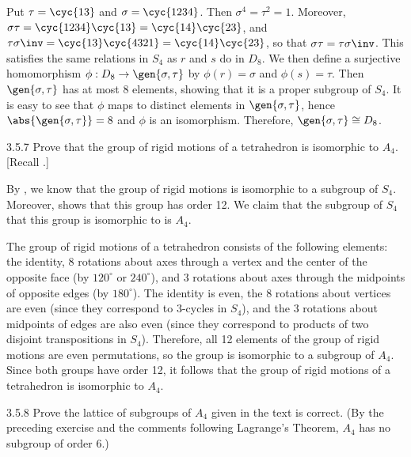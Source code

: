 \begin{sol}
    Put $\tau = \cyc{1 3}$ and $\sigma = \cyc{1 2 3 4}$.
	Then $\sigma^4 = \tau^2 = 1$.
	Moreover, $\sigma\tau = \cyc{1 2 3 4}\cyc{1 3} = \cyc{1 4}\cyc{2 3}$, and $\tau\sigma\inv = \cyc{1 3}\cyc{4 3 2 1} = \cyc{1 4}\cyc{2 3}$, so that $\sigma\tau = \tau\sigma\inv$.
	This satisfies the same relations in $S_4$ as $r$ and $s$ do in $D_8$.
	We then define a surjective homomorphism $\phi : D_8 \to \gen{\sigma, \tau}$ by $\phi(r) = \sigma$ and $\phi(s) = \tau$.
	Then $\gen{\sigma, \tau}$ has at most 8 elements, showing that it is a proper subgroup of $S_4$.
	It is easy to see that $\phi$ maps to distinct elements in $\gen{\sigma, \tau}$, hence $\abs{\gen{\sigma, \tau}} = 8$ and $\phi$ is an isomorphism.
	Therefore, $\gen{\sigma, \tau} \cong D_8$.
\end{sol}

\begin{exercise}{3.5.7}
    Prove that the group of rigid motions of a tetrahedron is isomorphic to $A_4$. [Recall .]
\end{exercise}

\begin{sol}
    By , we know that the group of rigid motions is isomorphic to a subgroup of $S_4$.
	Moreover,  shows that this group has order 12.
	We claim that the subgroup of $S_4$ that this group is isomorphic to is $A_4$. 

    The group of rigid motions of a tetrahedron consists of the following elements: the identity, 8 rotations about axes through a vertex and the center of the opposite face (by $120^\circ$ or $240^\circ$), and 3 rotations about axes through the midpoints of opposite edges (by $180^\circ$).
	The identity is even, the 8 rotations about vertices are even (since they correspond to $3$-cycles in $S_4$), and the 3 rotations about midpoints of edges are also even (since they correspond to products of two disjoint transpositions in $S_4$).
	Therefore, all 12 elements of the group of rigid motions are even permutations, so the group is isomorphic to a subgroup of $A_4$.
	Since both groups have order 12, it follows that the group of rigid motions of a tetrahedron is isomorphic to $A_4$.
\end{sol}

\begin{exercise}{3.5.8}
    Prove the lattice of subgroups of $A_4$ given in the text is correct. (By the preceding exercise and the comments following Lagrange's Theorem, $A_4$ has no subgroup of order $6$.)
\end{exercise}

